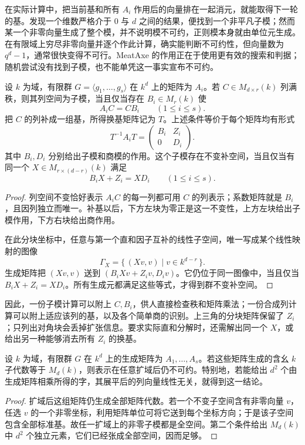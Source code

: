 在实际计算中，把当前基和所有 \(A_i\) 作用后的向量排在一起消元，就能取得下一轮的基。发现一个维数严格介于 \(0\) 与 \(d\) 之间的结果，便找到一个非平凡子模；然而某一个非零向量生成了整个模，并不说明模不可约，正则模本身就由单位元生成。在有限域上穷尽非零向量并逐个作此计算，确实能判断不可约性，但向量数为 \(q^d-1\)，通常很快变得不可行。MeatAxe 的作用正在于使用更有效的搜索和判据；随机尝试没有找到子模，也不能单凭这一事实宣布不可约。

\begin{proposition}\label{b5:prop:matrix-submodule-certificate}
	设 \(k\) 为域，有限群 \(G=\langle g_1,\ldots,g_s\rangle\) 在 \(k^d\) 上的矩阵为 \(A_i\)。若 \(C\in M_{d\times r}(k)\) 列满秩，则其列空间为子模，当且仅当存在 \(B_i\in M_r(k)\) 使
	\[
		A_iC=CB_i\qquad(1\le i\le s).
	\]
	把 \(C\) 的列补成一组基，所得换基矩阵记为 \(T\)。上述条件等价于每个矩阵均有形式
	\[
		T^{-1}A_iT=
		\begin{pmatrix}B_i&Z_i\\0&D_i\end{pmatrix}.
	\]
	其中 \(B_i,D_i\) 分别给出子模和商模的作用。这个子模存在不变补空间，当且仅当有同一个 \(X\in M_{r\times(d-r)}(k)\) 满足
	\[
		B_iX+Z_i=XD_i\qquad(1\le i\le s).
	\]
\end{proposition}
\begin{proof}
	列空间不变恰好表示 \(A_iC\) 的每一列都可用 \(C\) 的列表示；系数矩阵就是 \(B_i\)，且因列独立而唯一。补基以后，下方左块为零正是这一不变性，上方左块给出子模作用，下方右块给出商作用。

	在此分块坐标中，任意与第一个直和因子互补的线性子空间，唯一写成某个线性映射的图像
	\[
		\Gamma_X=\{\,(Xv,v)\mid v\in k^{d-r}\,\}.
	\]
	生成矩阵把 \((Xv,v)\) 送到 \((B_iXv+Z_iv,D_iv)\)。它仍位于同一图像中，当且仅当 \(B_iX+Z_i=XD_i\)。所有生成元都满足这些等式，才得到群不变补空间。
\end{proof}

因此，一份子模计算可以附上 \(C,B_i\)，供人直接检查秩和矩阵乘法；一份合成列计算可以附上适应该列的基，以及各个简单商的识别。上三角的分块矩阵保留了 \(Z_i\)；只列出对角块会丢掉扩张信息。要求实际直和分解时，还需解出同一个 \(X\)，或给出另一种能够消去所有 \(Z_i\) 的换基。

\begin{proposition}\label{b5:prop:full-matrix-algebra-certificate}
	设 \(k\) 为域，有限群 \(G\) 在 \(k^d\) 上的生成矩阵为 \(A_1,\ldots,A_s\)。若这些矩阵生成的含幺 \(k\) 子代数等于 \(M_d(k)\)，则表示在任意扩域后仍不可约。特别地，若能给出 \(d^2\) 个由生成矩阵相乘所得的字，其展平后的列向量线性无关，就得到这一结论。
\end{proposition}
\begin{proof}
	扩域后这组矩阵仍生成全部矩阵代数。若一个不变子空间含有非零向量 \(v\)，任选 \(v\) 的一个非零坐标，利用矩阵单位可将它送到每个坐标方向；于是该子空间包含全部标准基。故任一扩域上的非零子模都是全空间。第二个条件给出 \(M_d(k)\) 中 \(d^2\) 个独立元素，它们已经张成全部空间，因而足够。
\end{proof}

